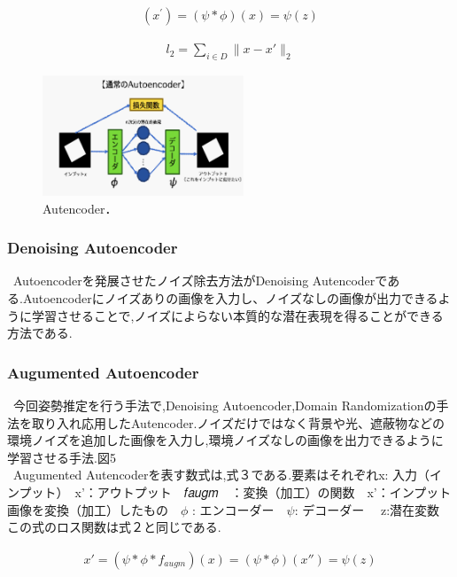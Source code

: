 \documentclass[11pt,a4j,ascmac]{jarticle}
\begin{document}
\begin{eqnarray}
\label{eq:polynomial1}
( x ^ {\prime})  = (\psi *  \phi )( x ) = \psi (z)
\end{eqnarray}


\begin{eqnarray}
\label{eq:polynomial1}
l_2=  \sum_{i \in D}\parallel{ x - x'} \parallel_2
\end{eqnarray}


     \begin{figure}[htpp]
     \centering
      \includegraphics[width=60mm]{pic7.eps}
      \vspace*{30mm}
      \caption{Autencoder．}
      \label{fig:2d_pose_estimation}
      \end{figure}




\subsubsection{Denoising Autoencoder}
\  Autoencoderを発展させたノイズ除去方法がDenoising Autencoderである.Autoencoderにノイズありの画像を入力し、ノイズなしの画像が出力できるように学習させることで,ノイズによらない本質的な潜在表現を得ることができる方法である.


\subsubsection{Augumented Autoencoder}
\ 今回姿勢推定を行う手法で,Denoising Autoencoder,Domain Randomizationの手法を取り入れ応用したAutencoder.ノイズだけではなく背景や光、遮蔽物などの環境ノイズを追加した画像を入力し,環境ノイズなしの画像を出力できるように学習させる手法.図5\\
\ Augumented Autencoderを表す数式は,式３である.要素はそれぞれx: 入力（インプット）　x’：アウトプット　𝑓𝑎𝑢𝑔𝑚　：変換（加工）の関数　x’：インプット画像を変換（加工）したもの　$\phi$ : エンコーダー　$\psi$: デコーダー 　z:潜在変数　 この式のロス関数は式２と同じである.

\begin{eqnarray}
\label{eq:polynomial1}
x ' = (\psi *  \phi * f_{augm} )( x ) = (\psi * \phi) (x'') = \psi (z)
\end{eqnarray}
\end{document}
